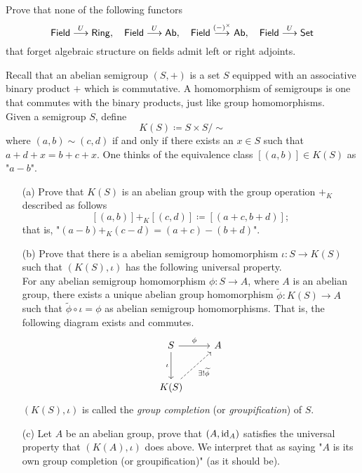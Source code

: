 \vspace*{0.1in}

\begin{problem}\label{prob 8.3}
Prove that none of the following functors
\[\mathsf{Field} \overset{U}{\longrightarrow} \mathsf{Ring},\quad \mathsf{Field} \overset{U}{\longrightarrow} \mathsf{Ab},\quad \mathsf{Field} \overset{(-)^\times}{\longrightarrow} \mathsf{Ab},\quad \mathsf{Field} \overset{U}{\longrightarrow} \mathsf{Set}\]
that forget algebraic structure on fields admit left or right adjoints.
\end{problem}

\vspace*{0.1in}

\begin{problem}\label{prob 8.4}
Recall that an abelian semigroup $(S,+)$ is a set $S$ equipped with an associative binary product $+$ which is commutative. A homomorphism of semigroups is one that commutes with the binary products, just like group homomorphisms.\\[1em]
Given a semigroup $S$, define
\[K(S) \coloneqq S \times S/\!\!\sim\]
where $(a,b) \sim (c,d)$ if and only if there exists an $x\in S$ such that $a+d+x = b+c+x$. One thinks of the equivalence class $[(a,b)] \in K(S)$ as "$a-b$".
\begin{itemize}
\item[(a)] Prove that $K(S)$ is an abelian group with the group operation $+_K$ described as follows
\[[(a,b)] +_K [(c,d)] \coloneqq [(a+c,b+d)];\] 
that is, "$(a-b) +_K (c-d) = (a+c) - (b+d)$".
\item[(b)] Prove that there is a abelian semigroup homomorphism $\iota:S \to K(S)$ such that $(K(S),\iota)$ has the following universal property.\\[0.5em]
For any abelian semigroup homomorphism $\phi:S \to A$, where $A$ is an abelian group, there exists a unique abelian group homomorphism $\widetilde{\phi}:K(S) \to A$ such that
$\widetilde{\phi}\circ \iota = \phi$ as abelian semigroup homomorphisms. That is, the following diagram exists and commutes.
\[\begin{tikzcd}
S \arrow[r, "\phi"] \arrow[d, "\iota"']                           & A \\[1em]
K(S) \arrow[ru, "\exists!\widetilde{\phi}"', dashed] &  
\end{tikzcd}\]
$(K(S),\iota)$ is called the \emph{group completion} (or \emph{groupification}) of $S$.
\item[(c)] Let $A$ be an abelian group, prove that $(A,\operatorname{id}_A)$ satisfies the universal property that $(K(A),\iota)$ does above. We interpret that as saying "$A$ is its own group completion (or groupification)" (as it should be).

\end{itemize}
\end{problem}
